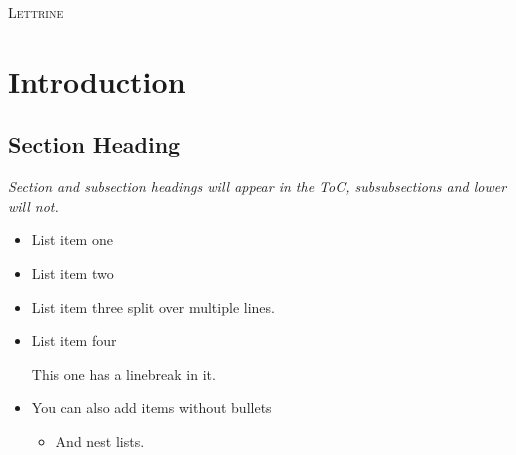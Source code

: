\documentclass[a5paper, openany, twoside, 10pt]{memoir}
\begin{document}
\setcounter{page}{1}

\begin{vplace}
\lettrine{L}{ettrine} \lipsum[1]
\end{vplace}



\chapter{Introduction}

\lipsum[1]

\section{Section Heading}
\label{section-section-heading}

\emph{Section and subsection headings will appear in the ToC, subsubsections and lower will not.}
\begin{itemize}
    \item List item one
    \item List item two
    \item List item three
        split over multiple lines.
    \item List item four

    This one has a linebreak in it.

    \item[] You can also add items without bullets

    \begin{itemize}
        \item And nest lists.
    \end{itemize}
\end{itemize}
\end{document}
